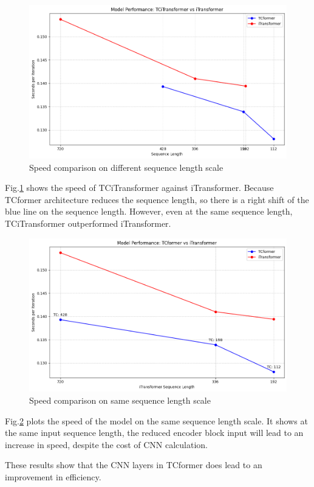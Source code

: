\documentclass[stu,12pt,floatsintext]{apa7}
\begin{document}
\begin{figure}[H]
    \centering
    \includegraphics[width=0.8\linewidth]{images/efficiency-cmp1.png}
    \caption{Speed comparison on different sequence length scale}
    \label{fig:efficiency-cmp1}
\end{figure}

Fig.\ref{fig:efficiency-cmp1} shows the speed of TCiTransformer against iTransformer. Because TCformer architecture reduces the sequence length, so there is a right shift of the blue line on the sequence length. However, even at the same sequence length, TCiTransformer outperformed iTransformer.

\begin{figure}[H]
    \centering
    \includegraphics[width=0.8\linewidth]{images/efficiency-cmp2.png}
    \caption{Speed comparison on same sequence length scale}
    \label{fig:efficiency-cmp2}
\end{figure}

Fig.\ref{fig:efficiency-cmp2} plots the speed of the model on the same sequence length scale. It shows at the same input sequence length, the reduced encoder block input will lead to an increase in speed, despite the cost of CNN calculation. 

These results show that the CNN layers in TCformer does lead to an improvement in efficiency.
\end{document}
